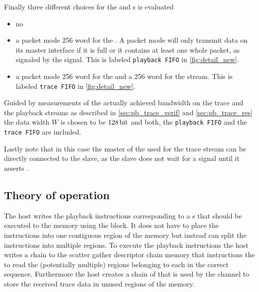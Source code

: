 Finally three different choices for the \SToMM{} and \MMToS{} \FIFO{}s is evaluated
\begin{itemize}
\item no \FIFO{}
\item a packet mode \num{256} word \FIFO{} for the \MMToS{} \AXIStream{}. A packet mode \FIFO{} will only transmit data on its master interface if it is full or it contains at least one whole packet, as signaled by the \TLAST{} signal. This \FIFO{} is labeled \texttt{playback FIFO} in \autoref{fig:detail_new}.
\item a packet mode \num{256} word \FIFO{} for the \MMToS{} \AXIStream{} and a \num{256} word \FIFO{} for the \SToMM{} stream. This \FIFO{} is labeled \texttt{trace FIFO} in \autoref{fig:detail_new}.
\end{itemize}

Guided by measurements of the actually achieved bandwidth on the trace and the playback streams as described in \autoref{sec:pb_trace_verif} and \autoref{sec:pb_trace_res} the data width $W$ is chosen to be $\SI{128}{\bit}$ and both, the \texttt{playback FIFO} and the \texttt{trace FIFO} are included.

Lastly note that in this case the \ValidNextStream{} master of the \pbexec{} used for the trace stream can be directly connected to the \SToMM{} \AXIStream{} slave, as the \SToMM{} \AXIStream{} slave does not wait for a \TVALID{} signal until it asserts \TREADY{}.




\subsection{Theory of operation}

The host writes the playback instructions corresponding to a \PlaybackProgram{}s that should be executed to the \DDR{} memory using the \FAXI{} block. It does not have to place the instructions into one contiguous region of the memory but instead can split the instructions into multiple regions.
To execute the playback instructions the host writes a \descriptor{} chain to the scatter gather descriptor chain memory that instructions the \AXIDMA{} to read the (potentially multiple) regions belonging to each \PlaybackProgram{} in the correct sequence.
Furthermore the host creates a chain of \descriptor{} that is used by the \SToMM{} channel to store the received trace data in unused regions of the \DDR{} memory.

